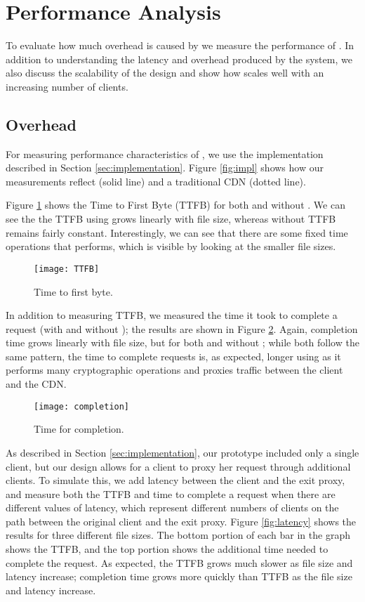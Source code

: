 \section{Performance Analysis}
\label{sec:performance}
To evaluate how much overhead is caused by \system{} we measure the performance 
of \system{}.  In addition to understanding the latency and overhead produced by the 
system, we also discuss the scalability of the design and show how \system{} scales 
well with an increasing number of clients.

\subsection{\system{} Overhead}
For measuring performance characteristics of \system{}, we use the implementation 
described in Section \ref{sec:implementation}.  Figure \ref{fig:impl} shows 
how our measurements reflect \system{} (solid line) and a traditional CDN (dotted 
line).  

Figure \ref{fig:ttfb} shows the Time to First Byte (TTFB) for both \system{} and 
without \system{}.  We can see the the TTFB using \system{} grows linearly with 
file size, whereas without \system{} TTFB remains fairly constant.  Interestingly, 
we can see that there are some fixed time operations that \system{} performs, which 
is visible by looking at the smaller file sizes.

\begin{figure}[t!]
\centering
\texttt{[image: TTFB]}
\caption{Time to first byte.}
\label{fig:ttfb}
\end{figure}

In addition to measuring TTFB, we measured the time it took to complete a request (with and 
without \system{}); the results are shown in Figure \ref{fig:completion}.  Again, completion time 
grows linearly with file size, but for both \system{} and without \system{}; while both follow the 
same pattern, the time to complete requests is, as expected, longer using \system{} as it performs 
many cryptographic operations and proxies traffic between the client and the CDN.  

\begin{figure}[b!]
\centering
\texttt{[image: completion]}
\caption{Time for completion.}
\label{fig:completion}
\end{figure}

As described in Section \ref{sec:implementation}, our prototype included only a single client, but 
our design allows for a client to proxy her request through additional clients.  To simulate this, we 
add latency between the client and the exit proxy, and measure both the TTFB and time to complete a request 
when there are different values of latency, which represent different numbers of clients on the path between the 
original client and the exit proxy.  Figure \ref{fig:latency} shows the results for three different file sizes. The 
bottom portion of each bar in the graph shows the TTFB, and the top portion shows the additional time needed 
to complete the request.  As expected, the TTFB grows much slower as file size and latency increase; completion time 
grows more quickly than TTFB as the file size and latency increase.   

